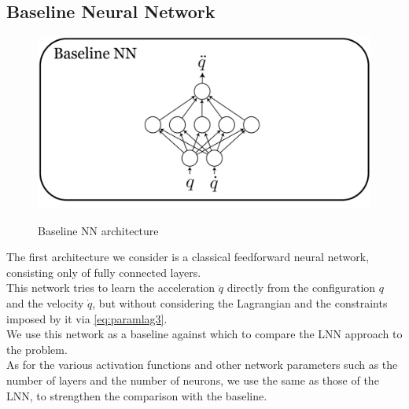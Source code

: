 \documentclass[a4paper]{article}
\begin{document}
\subsection{Baseline Neural Network}
\begin{figure}
\begin{center}
    \label{img:baseline_arch}
    \includegraphics[scale=0.1]{./img/baseline_nn.png}  
    \caption{Baseline NN architecture}
\end{center}
\end{figure}

The first architecture we consider is a classical feedforward neural network, consisting only of fully connected layers.\\ This network tries to learn the acceleration $\ddot{q}$ directly from the configuration $q$ and the velocity $\dot{q}$, but without considering the Lagrangian and the constraints imposed by it via \eqref{eq:paramlag3}.\\ We use this network as a baseline against which to compare the LNN approach to the problem.\\ As for the various activation functions and other network parameters such as the number of layers and the number of neurons, we use the same as those of the LNN, to strengthen the comparison with the baseline.

\end{document}
